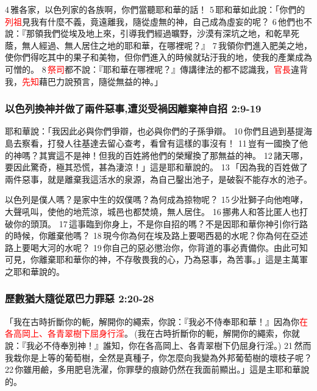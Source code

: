 4 雅各家，以色列家的各族啊，你們當聽耶和華的話！ 5 耶和華如此說：「你們的\textcolor{red}{列祖}見我有什麼不義，竟遠離我，隨從虛無的神，自己成為虛妄的呢？ 6 他們也不說：『那領我們從埃及地上來，引導我們經過曠野，沙漠有深坑之地，和乾旱死蔭，無人經過、無人居住之地的耶和華，在哪裡呢？』 7 我領你們進入肥美之地，使你們得吃其中的果子和美物，但你們進入的時候就玷汙我的地，使我的產業成為可憎的。 8 \textcolor{red}{祭司}都不說：『耶和華在哪裡呢？』傳講律法的都不認識我，\textcolor{red}{官長}違背我，\textcolor{red}{先知}藉巴力說預言，隨從無益的神。」

\subsubsection{以色列換神并做了兩件惡事,遭災受禍因離棄神自招 2:9-19}
耶和華說：「我因此必與你們爭辯，也必與你們的子孫爭辯。 10 你們且過到基提海島去察看，打發人往基達去留心查考，看曾有這樣的事沒有！ 11 豈有一國換了他的神嗎？其實這不是神！但我的百姓將他們的榮耀換了那無益的神。 12 諸天哪，要因此驚奇，極其恐慌，甚為淒涼！」這是耶和華說的。 13 「因為我的百姓做了兩件惡事，就是離棄我這活水的泉源，為自己鑿出池子，是破裂不能存水的池子。


以色列是僕人嗎？是家中生的奴僕嗎？為何成為掠物呢？ 15 少壯獅子向他咆哮，大聲吼叫，使他的地荒涼，城邑也都焚燒，無人居住。 16 挪弗人和答比匿人也打破你的頭頂。 17 這事臨到你身上，不是你自招的嗎？不是因耶和華你神引你行路的時候，你離棄他嗎？ 18 現今你為何在埃及路上要喝西曷的水呢？你為何在亞述路上要喝大河的水呢？ 19 你自己的惡必懲治你，你背道的事必責備你。由此可知可見，你離棄耶和華你的神，不存敬畏我的心，乃為惡事，為苦事。」這是主萬軍之耶和華說的。

\subsubsection{歷數猶大隨從眾巴力罪惡 2:20-28}
「我在古時折斷你的軛，解開你的繩索，你說：『我必不侍奉耶和華！』因為你\textcolor{red}{在各高岡上、各青翠樹下屈身行淫}。 (我在古時折斷你的軛，解開你的繩索，你就說：『我必不侍奉別神！』誰知，你在各高岡上、各青翠樹下仍屈身行淫。) 21 然而我栽你是上等的葡萄樹，全然是真種子，你怎麼向我變為外邦葡萄樹的壞枝子呢？ 22 你雖用鹼，多用肥皂洗濯，你罪孽的痕跡仍然在我面前顯出。」這是主耶和華說的。 

